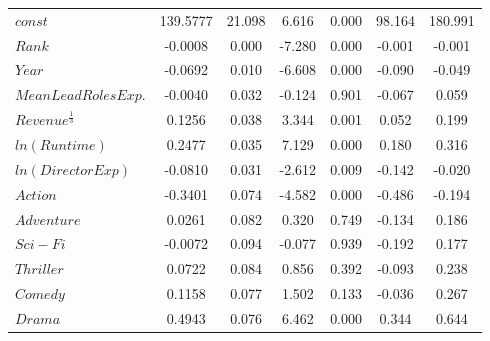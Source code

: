 \begin{center}
\begin{tabular}{lcccccc}
                    \midrule
                    \textbf{$const$}                 & 139.5777      & 21.098           & 6.616      & 0.000               & 98.164          & 180.991         \\
                    \textbf{$Rank$}                  & -0.0008       & 0.000            & -7.280     & 0.000               & -0.001          & -0.001          \\
                    \textbf{$Year$}                  & -0.0692       & 0.010            & -6.608     & 0.000               & -0.090          & -0.049          \\
                    \textbf{$Mean Lead Roles Exp.$}  & -0.0040       & 0.032            & -0.124     & 0.901               & -0.067          & 0.059           \\
                    \textbf{$Revenue^{\frac{1}{3}}$} & 0.1256        & 0.038            & 3.344      & 0.001               & 0.052           & 0.199           \\
                    \textbf{$ln(Runtime)$}           & 0.2477        & 0.035            & 7.129      & 0.000               & 0.180           & 0.316           \\
                    \textbf{$ln(Director Exp)$}      & -0.0810       & 0.031            & -2.612     & 0.009               & -0.142          & -0.020          \\
                    \textbf{$Action$}                & -0.3401       & 0.074            & -4.582     & 0.000               & -0.486          & -0.194          \\
                    \textbf{$Adventure$}             & 0.0261        & 0.082            & 0.320      & 0.749               & -0.134          & 0.186           \\
                    \textbf{$Sci-Fi$}                & -0.0072       & 0.094            & -0.077     & 0.939               & -0.192          & 0.177           \\
                    \textbf{$Thriller$}              & 0.0722        & 0.084            & 0.856      & 0.392               & -0.093          & 0.238           \\
                    \textbf{$Comedy$}                & 0.1158        & 0.077            & 1.502      & 0.133               & -0.036          & 0.267           \\
                    \textbf{$Drama$}                 & 0.4943        & 0.076            & 6.462      & 0.000               & 0.344           & 0.644           \\

\end{tabular}
\end{center}
